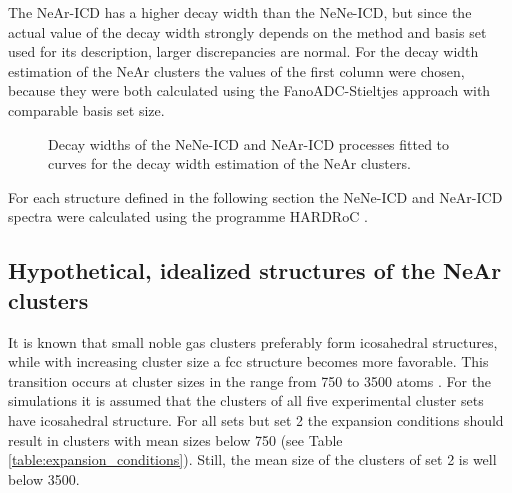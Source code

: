 The NeAr-ICD has a higher decay width than the NeNe-ICD, but since the
actual value of the decay width strongly depends on the method and basis set
used for its description, larger discrepancies are normal. For the decay
width estimation of the NeAr clusters the values of the first column were
chosen, because they were both calculated using the FanoADC-Stieltjes approach
with comparable basis set size.

\begin{figure}[h]
 \centering
 
 \caption{Decay widths of the NeNe-ICD and NeAr-ICD processes fitted to
          curves for the decay width estimation of the NeAr clusters.}
 \label{figure:fitted_NeAr_widths}
\end{figure}

For each structure defined in the following section the NeNe-ICD and NeAr-ICD
spectra were calculated using the programme HARDRoC \cite{HARDRoC}.




\subsection{Hypothetical, idealized structures of the NeAr clusters}

It is known that small noble gas clusters preferably form icosahedral structures,
while with increasing cluster size a fcc structure becomes more favorable. This transition
occurs at cluster sizes in the range from 750 to 3500 atoms \cite{Martin96,Doye97,Hartke02}.
For the simulations it is assumed that the clusters of all
five experimental cluster sets have 
icosahedral structure. For all sets but set 2 the expansion conditions should result in clusters 
with mean sizes below 750 (see Table \ref{table:expansion_conditions}). Still,
the mean size of the clusters of set 2 is well below 3500.

